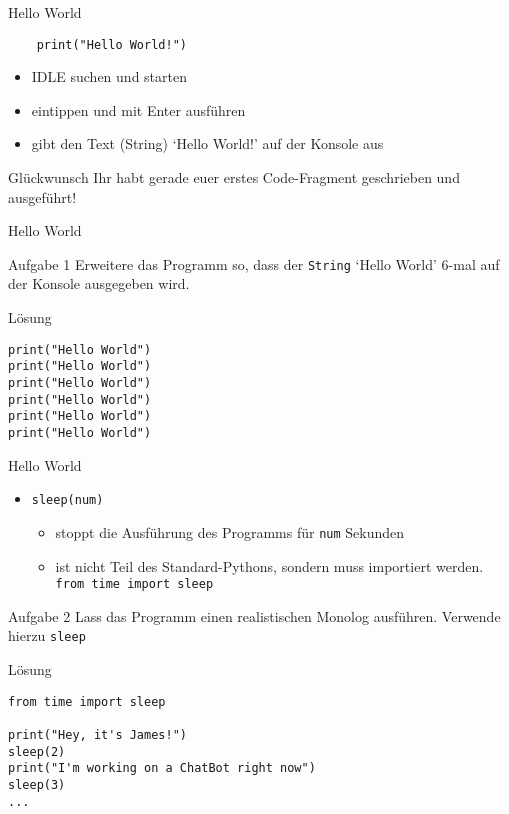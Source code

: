 \begin{frame}[fragile]{Hello World}
    \begin{lstlisting}
    print("Hello World!")
    \end{lstlisting}
    \begin{itemize}
        \item IDLE suchen und starten
        \item eintippen und mit Enter ausführen
        \item gibt den Text (String) `Hello World!' auf der Konsole aus
    \end{itemize}
    \begin{exampleblock}{Glückwunsch}
    Ihr habt gerade euer erstes Code-Fragment geschrieben und ausgeführt!
    \end{exampleblock}
\end{frame}

\begin{frame}[fragile]{Hello World}
    \begin{block}{Aufgabe 1}
        Erweitere das Programm so, dass der \texttt{String} `Hello World'
        6-mal auf der Konsole ausgegeben wird.
    \end{block}
    \pause{}
    \begin{exampleblock}{Lösung}
        \begin{lstlisting}
print("Hello World")
print("Hello World")
print("Hello World")
print("Hello World")
print("Hello World")
print("Hello World")
        \end{lstlisting}
    \end{exampleblock}
\end{frame}

\begin{frame}[fragile]{Hello World}
    \begin{itemize}
        \item \texttt{sleep(num)}
            \begin{itemize}
                \item stoppt die Ausführung des Programms für \texttt{num} Sekunden
                \item ist nicht Teil des Standard-Pythons, sondern muss importiert 
                    werden. \lstinline[columns=fixed]{from time import sleep}
            \end{itemize}
    \end{itemize}
    \pause{}
    \begin{block}{Aufgabe 2}
        Lass das Programm einen realistischen Monolog ausführen. 
        Verwende hierzu \texttt{sleep}
    \end{block}
    \pause{}
    \begin{exampleblock}{Lösung}
        \begin{lstlisting}
from time import sleep

print("Hey, it's James!")
sleep(2)
print("I'm working on a ChatBot right now")
sleep(3)
...
        \end{lstlisting}
    \end{exampleblock}

\end{frame}

